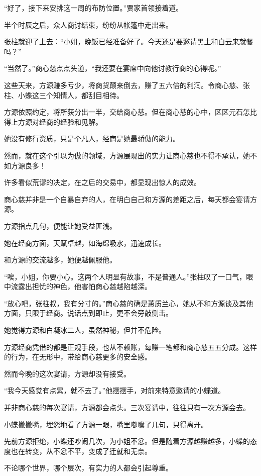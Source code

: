 \begin{this_body}
“好了，接下来安排这一周的布防位置。”贾家首领接着道。

半个时辰之后，众人商讨结束，纷纷从帐篷中走出来。

张柱就迎了上去：“小姐，晚饭已经准备好了。今天还是要邀请黑土和白云来就餐吗？”

“当然了。”商心慈点点头道，“我还要在宴席中向他讨教行商的心得呢。”

这些天来，方源赚多亏少，将商货颠来倒去，赚了五六倍的利润。令商心慈、张柱、小蝶这三个知情人，都刮目相待。

方源依照约定，将所获分出一半，交给商心慈。但在商心慈的心中，区区元石怎比得上方源对经商的经验和见解。

她没有修行资质，只是个凡人，经商是她最骄傲的能力。

然而，就在这个引以为傲的领域，方源展现出的实力让商心慈也不得不承认，她不如方源良多！

许多看似荒谬的决定，在之后的交易中，都显现出惊人的成效。

商心慈并非是一个自暴自弃的人，在明白自己和方源的差距之后，每天都会宴请方源。

方源指点几句，便能让她受益匪浅。

她在经商方面，天赋卓越，如海绵吸水，迅速成长。

和方源的交流越多，她便越佩服他。

“唉，小姐，你要小心。这两个人明显有故事，不是普通人。”张柱叹了一口气，眼中流露出担忧的神色，他害怕商心慈越陷越深。

“放心吧，张柱叔，我有分寸的。”商心慈的确是蕙质兰心，她从不和方源谈及其他方面，只限于经商。说话点到即止，更不会旁敲侧击。

她觉得方源和白凝冰二人，虽然神秘，但并不危险。

方源经商凭借的都是正规手段，也从不赖账，每赚一笔都和商心慈五五分成。这样的行为，在无形中，带给商心慈更多的安全感。

然而今晚的这次宴请，方源却没有接受。

“我今天感觉有点累，就不去了。”他摆摆手，对前来特意邀请的小蝶道。

并非商心慈的每次宴请，方源都会点头。三次宴请中，往往只有一次方源会去。

小蝶撇撇嘴，埋怨地看了方源一眼，嘴里嘟囔了几句，只得离开。

先前方源拒绝，小蝶还吵闹几次，为小姐不忿。但是随着方源越赚越多，小蝶的态度也在转变，从不忿不平，变成了迁就和无奈。

不论哪个世界，哪个层次，有实力的人都会引起尊重。


\end{this_body}
